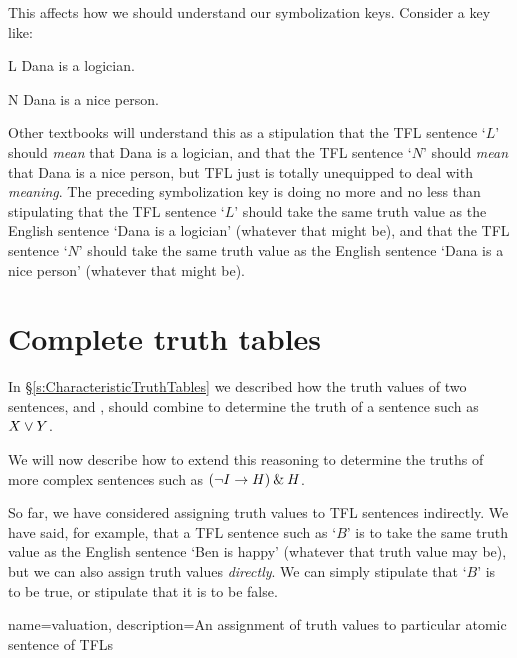 This affects how we should understand our symbolization keys. Consider a key like:
	\begin{ekey}
		\item[L] Dana is a logician.
		\item[N] Dana is a nice person.
	\end{ekey}
Other textbooks will understand this as a stipulation that the TFL sentence `$L$' should \emph{mean} that Dana is a logician, and that the TFL sentence `$N$' should \emph{mean} that Dana is a nice person, but TFL just is totally unequipped to deal with \emph{meaning}. The preceding symbolization key is doing no more and no less than stipulating that the TFL sentence `$L$' should take the same truth value as the English sentence `Dana is a logician' (whatever that might be), and that the TFL sentence `$N$' should take the same truth value as the English sentence `Dana is a nice person' (whatever that might be).



\chapter{Complete truth tables}
\label{s:CompleteTruthTables}

In \S\ref{s:CharacteristicTruthTables} we described how the truth values of two sentences, \metaX and \metaY, should combine to determine the truth of a sentence such as $X\vee Y$.

We will now describe how to extend this reasoning to determine the truths of more complex sentences such as $(\neg I\rightarrow H)\mathbin{\&} H$.

So far, we have considered assigning truth values to TFL sentences indirectly. We have said, for example, that a TFL sentence such as `$B$' is to take the same truth value as the English sentence `Ben is happy' (whatever that truth value may be), but we can also assign truth values \emph{directly}. We can simply stipulate that `$B$' is to be true, or stipulate that it is to be false.

{
name=valuation,
description={An assignment of \glspl{truth value} to particular atomic \glspl{sentence of TFL}}
}

